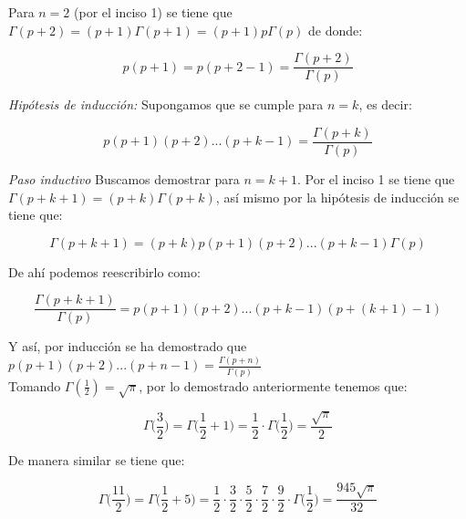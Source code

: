 Para $n=2$ (por el inciso 1) se tiene que $\Gamma (p+2)= (p+1) \Gamma (p+1)= (p+1) p \Gamma (p)$ de donde: 

\begin{equation*}
    p (p+1)= p (p+2-1)=  \frac{\Gamma(p+2)}{\Gamma (p)}
\end{equation*}

\textit{Hipótesis de inducción:} Supongamos que se cumple para $n=k$, es decir: 

\begin{equation*}
    p(p+1)(p+2)...(p+k-1)= \frac{\Gamma (p+k)}{\Gamma(p)}
\end{equation*}

\textit{Paso inductivo} Buscamos demostrar para $n= k+1$. Por el inciso 1 se tiene que $\Gamma (p+k+1)= (p+k) \Gamma (p+k)$, así mismo por la hipótesis de inducción se tiene que: 

\begin{equation*}
    \Gamma(p+k+1)= (p+k)p(p+1)(p+2)...(p+k-1) \Gamma (p)
\end{equation*}

De ahí podemos reescribirlo como: 

\begin{equation*}
    \frac{\Gamma(p+k+1)}{\Gamma (p)}= p (p+1)(p+2)...(p+k-1)(p+(k+1)-1)
\end{equation*}

Y así, por inducción se ha demostrado que $p(p+1)(p+2)...(p+n-1)= \frac{\Gamma(p+n)}{\Gamma (p)}$\\

Tomando $\Gamma (\frac{1}{2})= \sqrt{\pi}$, por lo demostrado anteriormente tenemos que: 

\begin{equation*}
    \Gamma \Big( \frac{3}{2} \Big)= \Gamma \Big( \frac{1}{2}+1 \Big)= \frac{1}{2} \cdot \Gamma \Big( \frac{1}{2} \Big)= \frac{\sqrt{\pi}}{2}
\end{equation*}

De manera similar se tiene que:

\begin{equation*}
    \Gamma \Big(\frac{11}{2} \Big)= \Gamma \Big( \frac{1}{2}+5 \Big)= \frac{1}{2} \cdot \frac{3}{2} \cdot \frac{5}{2} \cdot \frac{7}{2} \cdot \frac{9}{2} \cdot \Gamma \Big( \frac{1}{2} \Big)= \frac{945 \sqrt{\pi}}{32}
\end{equation*}

